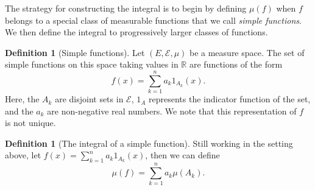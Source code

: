 \documentclass[11pt]{article}
\theoremstyle{definition}
\newtheorem{dfn}[thm]{Definition}
\theoremstyle{remark}
\begin{document}
The strategy for constructing the integral is to begin by defining $\mu(f)$ when $f$ belongs to a special class of measurable functions that we call \emph{simple functions}. We then define the integral to progressively larger classes of functions. 

\begin{dfn}[Simple functions]
Let $(E, \mathcal{E}, \mu)$ be a measure space. The set of simple functions on this space taking values in $\mathbb{R}$ are functions of the form
\[ f(x) = \sum_{k=1}^n a_k 1_{A_k}(x). \] Here, the $A_k$ are disjoint sets in $\mathcal{E}$, $1_{A}$ represents the indicator function of the set, and the $a_k$ are non-negative real numbers. We note that this representation of $f$ is not unique.
\end{dfn}

\begin{dfn}[The integral of a simple function]
Still working in the setting above, let $f(x) = \sum_{k=1}^n a_k 1_{A_k}(x)$, then we can define
\[ \mu(f) = \sum_{k=1}^n a_k \mu(A_k). \]
\end{dfn}
\end{document}
